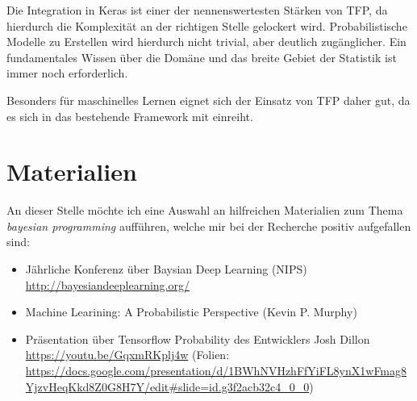 \documentclass[12pt]{article}
\begin{document}
Die Integration in Keras ist einer der nennenswertesten Stärken von TFP, da hierdurch die Komplexität an der richtigen Stelle gelockert wird. Probabilistische Modelle zu Erstellen wird hierdurch nicht trivial, aber deutlich zugänglicher. Ein fundamentales Wissen über die Domäne und das breite Gebiet der Statistik ist immer noch erforderlich. 

Besonders für maschinelles Lernen eignet sich der Einsatz von TFP daher gut, da es sich in das bestehende Framework mit einreiht.


\section{Materialien}

An dieser Stelle möchte ich eine Auswahl an hilfreichen Materialien zum Thema \textit{bayesian programming} aufführen, welche mir bei der Recherche positiv aufgefallen sind:
\begin{itemize}
  \item Jährliche Konferenz über Baysian Deep Learning (NIPS) \url{http://bayesiandeeplearning.org/}
  \item Machine Learining: A Probabilistic Perspective (Kevin P. Murphy)\cite{Murphy2012}
  \item Präsentation über Tensorflow Probability des Entwicklers Josh Dillon \url{https://youtu.be/GqxmRKplj4w} (Folien: \url{https://docs.google.com/presentation/d/1BWhNVHzhFfYiFL8ynX1wFmag8YjzvHeqKkd8Z0G8H7Y/edit#slide=id.g3f2acb32c4_0_0})
\end{itemize}


\newpage



\listoffigures
\lstlistoflistings
\end{document}
